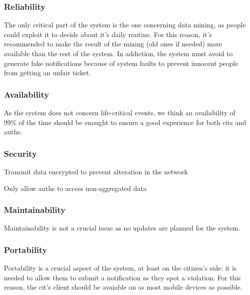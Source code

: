 \documentclass{article}
\begin{document}
		\subsubsection{Reliability}
			The only critical part of the system is the one concerning data mining, as people could exploit it to decide about it's daily routine. For this reason, it's recommended to make the result of the mining (old ones if needed) more available than the rest of the system.
			In addiction, the system must avoid to generate fake notifications because of system faults to prevent innocent people from getting an unfair ticket.
			
		\subsubsection{Availability}
			As the system does not concern life-critical events, we think an availability of 99\% of the time should be enought to ensure a good experience for both cits and auths.
			
		\subsubsection{Security}
			\begin{list}{-}{}
				\item Transmit data encrypted to prevent alteration in the network
				\item Only allow auths to access non-aggregated data
			\end{list}
			
		\subsubsection{Maintainability}
			Maintainability is not a crucial issue as no updates are planned for the system.
			
		\subsubsection{Portability}
			Portability is a crucial aspect of the system, at least on the citizen's side: it is needed to allow them to submit a notification as they spot a violation. For this reason, the cit's client should be avaiable on as most mobile devices as possible.
			
\end{document}
